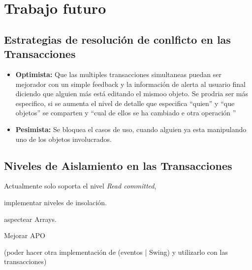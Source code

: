 
\section{Trabajo futuro}
\label{sec:futurework}


\subsection{Estrategias de resolución de conlficto en las Transacciones}

	\begin{itemize}

		\item{\bf Optimista:} Que las multiples  transacciones simultaneas puedan ser
		mejorador con un simple feedback y la información de alerta al
		usuario final diciendo que alguien más está editando el mismoo objeto.
		Se prodria ser más especifico, si se aumenta el nivel de detalle que especifica
		``quien'' y ``que objetos'' se comparten y ``cual de ellos se ha cambiado e
		otra operación ''
	
		\item{\bf Pesimista:} Se  bloquea el casos de uso, cuando alguien ya esta
		manipulando uno de los objetos involucrados. 

	\end{itemize}
	
\subsection{Niveles de Aislamiento en las Transacciones}
Actualmente solo soporta el nivel \emph{Read committed},  

implementar niveles de insolación.

aspectear Arrays.

Mejorar APO

(poder hacer otra implementación de (eventos | Swing) y utilizarlo con las
transacciones)

